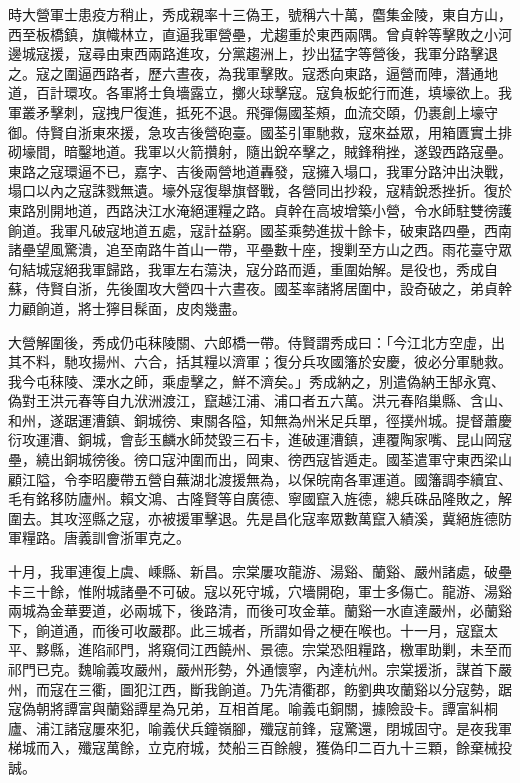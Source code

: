 \begin{pinyinscope}
時大營軍士患疫方稍止，秀成親率十三偽王，號稱六十萬，麕集金陵，東自方山，西至板橋鎮，旗幟林立，直逼我軍營壘，尤趨重於東西兩隅。曾貞幹等擊敗之小河邊城寇援，寇尋由東西兩路進攻，分黨趨洲上，抄出猛字等營後，我軍分路擊退之。寇之圍逼西路者，歷六晝夜，為我軍擊敗。寇悉向東路，逼營而陣，潛通地道，百計環攻。各軍將士負墻露立，擲火球擊寇。寇負板蛇行而進，填壕欲上。我軍叢矛擊刺，寇拽尸復進，抵死不退。飛彈傷國荃頰，血流交頤，仍裹創上壕守御。侍賢自浙東來援，急攻吉後營砲臺。國荃引軍馳救，寇來益眾，用箱匱實土排砌壕間，暗鑿地道。我軍以火箭攢射，隨出銳卒擊之，賊鋒稍挫，遂毀西路寇壘。東路之寇環逼不已，嘉字、吉後兩營地道轟發，寇擁入塌口，我軍分路沖出決戰，塌口以內之寇誅戮無遺。壕外寇復舉旗督戰，各營同出抄殺，寇精銳悉挫折。復於東路別開地道，西路決江水淹絕運糧之路。貞幹在高坡增築小營，令水師駐雙徬護餉道。我軍凡破寇地道五處，寇計益窮。國荃乘勢進拔十餘卡，破東路四壘，西南諸壘望風驚潰，追至南路牛首山一帶，平壘數十座，搜剿至方山之西。雨花臺守眾句結城寇絕我軍歸路，我軍左右蕩決，寇分路而遁，重圍始解。是役也，秀成自蘇，侍賢自浙，先後圍攻大營四十六晝夜。國荃率諸將居圍中，設奇破之，弟貞幹力顧餉道，將士獰目髹面，皮肉幾盡。

大營解圍後，秀成仍屯秣陵關、六郎橋一帶。侍賢謂秀成曰：「今江北方空虛，出其不料，馳攻揚州、六合，括其糧以濟軍；復分兵攻國籓於安慶，彼必分軍馳救。我今屯秣陵、溧水之師，乘虛擊之，鮮不濟矣。」秀成納之，別遣偽納王郜永寬、偽對王洪元春等自九洑洲渡江，竄越江浦、浦口者五六萬。洪元春陷巢縣、含山、和州，遂踞運漕鎮、銅城徬、東關各隘，知無為州米足兵單，徑撲州城。提督蕭慶衍攻運漕、銅城，會彭玉麟水師焚毀三石卡，進破運漕鎮，連覆陶家嘴、昆山岡寇壘，繞出銅城徬後。徬口寇沖圍而出，岡東、徬西寇皆遁走。國荃遣軍守東西梁山顧江隘，令李昭慶帶五營自蕪湖北渡援無為，以保皖南各軍運道。國籓調李續宜、毛有銘移防廬州。賴文鴻、古隆賢等自廣德、寧國竄入旌德，總兵硃品隆敗之，解圍去。其攻涇縣之寇，亦被援軍擊退。先是昌化寇率眾數萬竄入績溪，冀絕旌德防軍糧路。唐義訓會浙軍克之。

十月，我軍連復上虞、嵊縣、新昌。宗棠屢攻龍游、湯谿、蘭谿、嚴州諸處，破壘卡三十餘，惟附城諸壘不可破。寇以死守城，穴墻開砲，軍士多傷亡。龍游、湯谿兩城為金華要道，必兩城下，後路清，而後可攻金華。蘭谿一水直達嚴州，必蘭谿下，餉道通，而後可收嚴郡。此三城者，所謂如骨之梗在喉也。十一月，寇竄太平、黟縣，進陷祁門，將窺伺江西饒州、景德。宗棠恐阻糧路，檄軍助剿，未至而祁門已克。魏喻義攻嚴州，嚴州形勢，外通懷寧，內達杭州。宗棠援浙，謀首下嚴州，而寇在三衢，圖犯江西，斷我餉道。乃先清衢郡，飭劉典攻蘭谿以分寇勢，踞寇偽朝將譚富與蘭谿譚星為兄弟，互相首尾。喻義屯銅關，據險設卡。譚富糾桐廬、浦江諸寇屢來犯，喻義伏兵鐘嶺腳，殲寇前鋒，寇驚還，閉城固守。是夜我軍梯城而入，殲寇萬餘，立克府城，焚船三百餘艘，獲偽印二百九十三顆，餘棄械投誠。


\end{pinyinscope}
